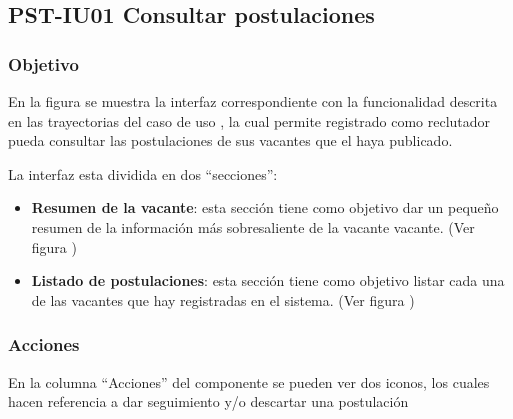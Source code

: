 \clearpage
\subsection{PST-IU01 Consultar postulaciones}

\subsubsection{Objetivo}
En la figura  se muestra la interfaz correspondiente con la funcionalidad descrita en las
trayectorias del caso de uso  , la cual permite registrado como reclutador pueda consultar las postulaciones de sus vacantes que el haya publicado.

La interfaz  esta dividida en dos ``secciones'':
\begin{itemize}
    \item \textbf{Resumen de la vacante}: esta sección tiene como objetivo dar un pequeño resumen de la información más sobresaliente de la vacante vacante. (Ver figura )
   \item \textbf{Listado de postulaciones}: esta sección tiene como objetivo listar cada una de las vacantes que hay registradas en el sistema. (Ver figura )
\end{itemize}


\subsubsection{Acciones}
En la columna ``Acciones'' del componente  se pueden ver dos iconos, los cuales hacen referencia a dar seguimiento y/o descartar una postulación